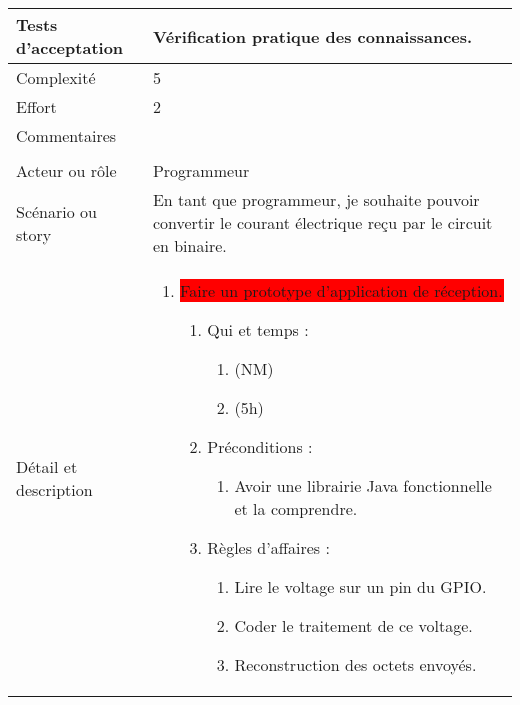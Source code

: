 \begin{longtable}{|l|p{}|}
\hline
    Tests d'acceptation & Vérification pratique des connaissances. \\
\hline
    Complexité & 5 \\
\hline
    Effort & 2 \\
\hline
    Commentaires & \\

\hline
    \rowcolor{Gray}
    \multicolumn{2}{|l|}{6} \\
\hline
    Acteur ou rôle & Programmeur \\
\hline
    Scénario ou story & En tant que programmeur, je
    souhaite pouvoir convertir le courant électrique reçu par le circuit en binaire. \\
\hline
    Détail et description &
        \begin{enumerate}[label*=\arabic*.]
            \item \colorbox{Red}{\parbox{13cm}{Faire un prototype d'application de réception.}}
                \begin{enumerate}[label*=\arabic*.]
                                \item Qui et temps :
                                \begin{enumerate}[label*=\arabic*.]
                                    \item (NM)
                                    \item (5h)
                                \end{enumerate}
                                \item Préconditions :
                                \begin{enumerate}[label*=\arabic*.]
                                    \item Avoir une librairie Java fonctionnelle et la comprendre.
                                \end{enumerate}
                                \item Règles d'affaires :
                                \begin{enumerate}[label*=\arabic*.]
                                    \item Lire le voltage sur un pin du GPIO.
                                    \item Coder le traitement de ce voltage.
                                    \item Reconstruction des octets envoyés.
                                \end{enumerate}

\end{enumerate}
\end{enumerate}
\end{longtable}
